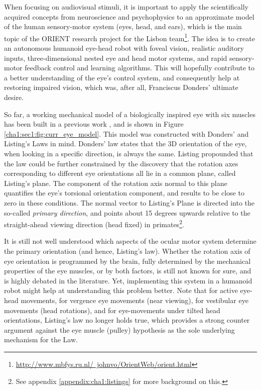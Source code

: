 When focusing on audiovisual stimuli, it is important to apply the scientifically acquired concepts from neuroscience and psychophysics to an approximate model of the human sensory-motor system (eyes, head, and ears), which is the main topic of the ORIENT research project for the Lisbon team\footnote{\href{http://www.mbfys.ru.nl/~johnvo/OrientWeb/orient.html}{http://www.mbfys.ru.nl/~johnvo/OrientWeb/orient.html}}. 
The idea is to create an autonomous humanoid eye-head robot with foveal vision, realistic auditory inputs, three-dimensional nested eye and head motor systems, and rapid sensory-motor feedback control and learning algorithms. This will hopefully contribute to a better understanding of the eye's control system, and consequently help at restoring impaired vision, which was, after all, Franciscus Donders' ultimate desire. 

So far, a working mechanical model of a biologically inspired eye with six muscles has been built in a previous work \cite{tesemiguel}, and is shown in Figure \ref{cha1:sec1:fig:curr_eye_model}. This model was constructed with Donders' and Listing's Laws in mind. Donders' law states that the 3D orientation of the eye, when looking in a specific direction, is always the same. Listing propounded that the law could be further constrained by the discovery that the rotation axes corresponding to different eye orientations  all lie in a common plane, called Listing's plane. The component of the rotation axis normal to this plane quantifies the eye's torsional orientation component, and results to be close to zero in these conditions. The normal vector to Listing’s Plane is directed into the so-called \textit{primary direction}, and points about 15 degrees upwards relative to the straight-ahead viewing direction (head fixed) in primates\footnote{See appendix \ref{appendix:cha1:listings} for more background on this.}. 

It is still not well understood which aspects of the ocular motor system determine the primary orientation (and hence, Listing's law). Whether the rotation axis of eye orientation is programmed by the brain, fully determined by the mechanical properties of the eye muscles, or by both factors, is still not known for sure, and is highly debated in the literature. Yet, implementing this system in a humanoid robot might help at understanding this problem better. Note that for active eye-head movements, for vergence eye movements (near viewing), for vestibular eye movements (head rotations), and for eye-movements under tilted head orientations, Listing’s law no longer holds true, which provides a strong counter argument against the eye muscle (pulley) hypothesis as the sole underlying mechanism for the Law. \cite{donders}

